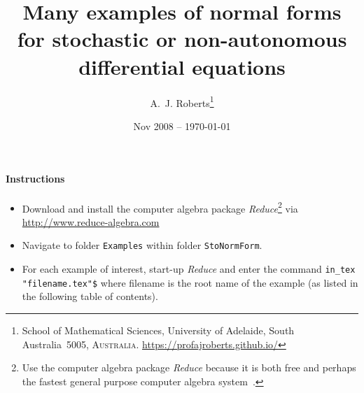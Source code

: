\documentclass[11pt,a4paper]{refart}
\title{Many examples of normal forms for stochastic or non-autonomous differential equations}
\author{A.~J. Roberts\thanks{School of Mathematical Sciences, University of Adelaide, South Australia~5005, \textsc{Australia}.
\url{https://profajroberts.github.io/}}}
\date{Nov 2008 -- \today}
\begin{document}
\maketitle


\paragraph{Instructions}
\begin{itemize}
\item Download and install the computer algebra package
\emph{Reduce}\footnote{Use the computer algebra package \emph{Reduce} 
because it is both free 
and perhaps the fastest general purpose computer algebra 
system~\cite[e.g.]{Fateman2002}.} via \url{http://www.reduce-algebra.com}



\item Navigate to folder \verb|Examples| within folder \verb|StoNormForm|.

\item For each example of interest, start-up \emph{Reduce} and enter the command \verb|in_tex "filename.tex"$|  where filename is the root name of the example (as listed in the following table of contents).

\end{itemize}


\tableofcontents


%
\let\subsubsection\subsection
\let\subsection\section











\end{document}
